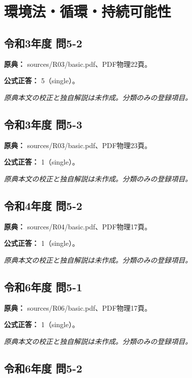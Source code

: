 \section{環境法・循環・持続可能性}

\subsection{令和3年度 問5-2}
\label{q:r03-reg-basic-5-2}

\noindent\textbf{原典：} sources/R03/basic.pdf、PDF物理22頁。

\textbf{公式正答：} 5（single）。

\par\textit{原典本文の校正と独自解説は未作成。分類のみの登録項目。}

\subsection{令和3年度 問5-3}
\label{q:r03-reg-basic-5-3}

\noindent\textbf{原典：} sources/R03/basic.pdf、PDF物理23頁。

\textbf{公式正答：} 1（single）。

\par\textit{原典本文の校正と独自解説は未作成。分類のみの登録項目。}

\subsection{令和4年度 問5-2}
\label{q:r04-reg-basic-5-2}

\noindent\textbf{原典：} sources/R04/basic.pdf、PDF物理17頁。

\textbf{公式正答：} 1（single）。

\par\textit{原典本文の校正と独自解説は未作成。分類のみの登録項目。}

\subsection{令和6年度 問5-1}
\label{q:r06-reg-basic-5-1}

\noindent\textbf{原典：} sources/R06/basic.pdf、PDF物理17頁。

\textbf{公式正答：} 1（single）。

\par\textit{原典本文の校正と独自解説は未作成。分類のみの登録項目。}

\subsection{令和6年度 問5-2}
\label{q:r06-reg-basic-5-2}

